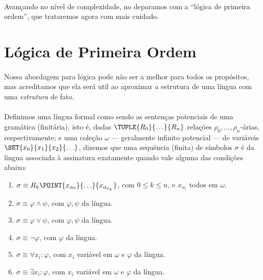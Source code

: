     \paragraph{}
        Avançando no nível de complexidade, no
        deparamos com a ``lógica de primeira ordem'',
        que trataremos agora com mais cuidado. %

    \section{Lógica de Primeira Ordem}
        \paragraph{}
            Nossa abordagem para lógica pode não ser
            a melhor para todos os propósitos, mas
            acreditamos que ela será util ao aproximar
            a estrutura de uma língua com uma
            {\em estrutura} de fato. %
        \paragraph{}
            Definimos uma língua formal como sendo
            as sentenças potenciais de uma gramática
            (finitária), isto é, dadas $\TUPLE{R_0}{\ldots}{R_n}$
            relações $\rho_0,\ldots,\rho_n$-árias,
            respectivamente; e uma coleção $\omega$ --- geralmente
            infinito potencial --- de variáveis
            $\SET{x_0}{x_1}{x_2}{\ldots}$, dizemos
            que uma sequência (finita) de símbolos $\sigma$ é
            da língua associada à assinatura
            exatamente quando vale alguma das
            condições abaixo:
        \begin{enumerate}[label=\alph*)]
            \item $\sigma\equiv R_k\POINT{x_{\alpha_0}}{\ldots}{x_{\alpha_{\rho_k}}}$, com $0\leq k\leq n$, e $x_{\alpha_i}$ todos em $\omega$.
            \item $\sigma\equiv \varphi\land\psi$, com $\varphi,\psi$ da língua.
            \item $\sigma\equiv \varphi\lor \psi$, com $\varphi,\psi$ da língua.
            \item $\sigma\equiv \neg\varphi$, com $\varphi$ da língua.
            \item $\sigma\equiv \forall x_i:\varphi$, com $x_i$ variável em $\omega$ e $\varphi$ da língua.
            \item $\sigma\equiv \exists x_i:\varphi$, com $x_i$ variável em $\omega$ e $\varphi$ da língua.
        \end{enumerate}
